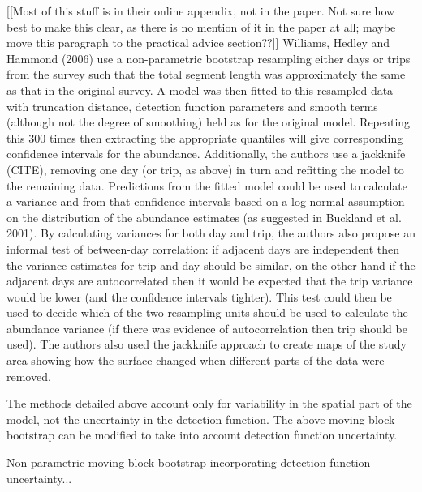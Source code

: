 \documentclass[useAMS,referee]{biom}
\begin{document}
[[Most of this stuff is in their online appendix, not in the paper. Not sure how best to make this clear, as there is no mention of it in the paper at all; maybe move this paragraph to the practical advice section??]] 
Williams, Hedley and Hammond (2006) use a non-parametric bootstrap resampling either days or trips from the survey such that the total segment length was approximately the same as that in the original survey. A model was then fitted to this resampled data with truncation distance, detection function parameters and smooth terms (although not the degree of smoothing) held as for the original model. Repeating this 300 times then extracting the appropriate quantiles will give corresponding confidence intervals for the abundance. Additionally, the authors use a jackknife (CITE), removing one day (or trip, as above) in turn and refitting the model to the remaining data. Predictions from the fitted model could be used to calculate a variance and from that confidence intervals based on a log-normal assumption on the distribution of the abundance estimates (as suggested in Buckland et al. 2001). By calculating variances for both day and trip, the authors also propose an informal test of between-day correlation: if adjacent days are independent then the variance estimates for trip and day should be similar, on the other hand if the adjacent days are autocorrelated then it would be expected that the trip variance would be lower (and the confidence intervals tighter). This test could then be used to decide which of the two resampling units should be used to calculate the abundance variance (if there was evidence of autocorrelation then trip should be used). The authors also used the jackknife approach to create maps of the study area showing how the surface changed when different parts of the data were removed.

The methods detailed above account only for variability in the spatial part of the model, not the uncertainty in the detection function. The above moving block bootstrap can be modified to take into account detection function uncertainty.




Non-parametric moving block bootstrap incorporating detection function uncertainty...
\end{document}
